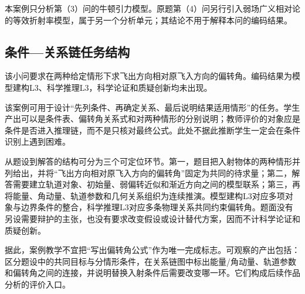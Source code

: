\documentclass[
  12pt,
  a4paper,twoside,openany]{ctexbook}
\begin{document}
本案例只分析第（3）问的牛顿引力模型。原题第（4）问另行引入弱场广义相对论的等效折射率模型，属于另一个分析单元；其结论不用于解释本问的编码结果。

\subsection{条件---关系链任务结构}\label{ux6761ux4ef6ux5173ux7cfbux94feux4efbux52a1ux7ed3ux6784}

该小问要求在两种给定情形下求飞出方向相对原飞入方向的偏转角。编码结果为模型建构L3、科学推理L3，科学论证和质疑创新均未出现。

该案例可用于设计``先列条件、再确定关系、最后说明结果适用情形''的任务。学生产出可以是条件表、偏转角关系式和对两种情形的分别说明；教师评价的对象应是条件是否进入推理链，而不是只核对最终公式。此处不据此推断学生一定会在条件识别上遇到困难。

从题设到解答的结构可分为三个可定位环节。第一，题目把入射物体的两种情形并列给出，并将``飞出方向相对原飞入方向的偏转角''固定为共同的待求量；第二，解答需要建立轨道对象、初始量、弱偏转近似和渐近方向之间的模型联系；第三，再将能量、角动量、轨道参数和几何关系组织为连续推演。模型建构L3对应多项对象与边界条件的整合，科学推理L3对应多条物理关系共同约束偏转角。题面没有另设需要辩护的主张，也没有要求改变假设或设计替代方案，因而不计科学论证和质疑创新。

据此，案例教学不宜把``写出偏转角公式''作为唯一完成标志。可观察的产出包括：区分题设中的共同目标与分情形条件，在关系链图中标出能量/角动量、轨道参数和偏转角之间的连接，并说明替换入射条件后需要改变哪一环。它们构成后续作品分析的评价入口。
\end{document}
